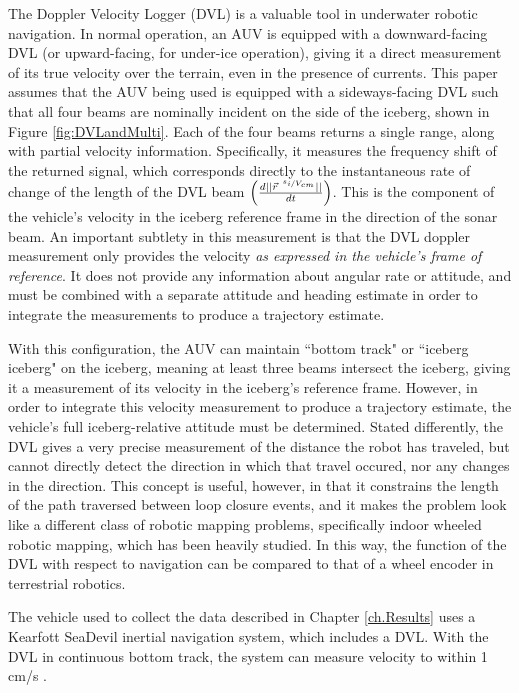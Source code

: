 The Doppler Velocity Logger (DVL) is a valuable tool in underwater robotic navigation. In normal operation, an AUV is equipped with a downward-facing DVL (or upward-facing, for under-ice operation), giving it a direct measurement of its true velocity over the terrain, even in the presence of currents. This paper assumes that the AUV being used is equipped with a sideways-facing DVL such that all four beams are nominally incident on the side of the iceberg, shown in Figure \ref{fig:DVLandMulti}. Each of the four beams returns a single range, along with partial velocity information. Specifically, it measures the frequency shift of the returned signal, which corresponds directly to the instantaneous rate of change of the length of the DVL beam $\left( \frac{d||\vec{r}^{~\nicefrac{s_i}{V_{cm}}}||}{dt}\right)$. This is the component of the vehicle's velocity in the iceberg reference frame in the direction of the sonar beam. An important subtlety in this measurement is that the DVL doppler measurement only provides the velocity \emph{as expressed in the vehicle's frame of reference}. It does not provide any information about angular rate or attitude, and must be combined with a separate attitude and heading estimate in order to integrate the measurements to produce a trajectory estimate. 

With this configuration, the AUV can maintain ``bottom track" or ``iceberg iceberg" on the iceberg, meaning at least three beams intersect the iceberg, giving it a measurement of its velocity in the iceberg's reference frame. However, in order to integrate this velocity measurement to produce a trajectory estimate, the vehicle's full iceberg-relative attitude must be determined. Stated differently, the DVL gives a very precise measurement of the distance the robot has traveled, but cannot directly detect the direction in which that travel occured, nor any changes in the direction. This concept is useful, however, in that it constrains the length of the path traversed between loop closure events, and it makes the problem look like a different class of robotic mapping problems, specifically indoor wheeled robotic mapping, which has been heavily studied. In this way, the function of the DVL with respect to navigation can be compared to that of a wheel encoder in terrestrial robotics.

The vehicle used to collect the data described in Chapter \ref{ch.Results} uses a Kearfott SeaDevil inertial navigation system, which includes a DVL. With the DVL in continuous bottom track, the system can measure velocity to within 1 cm/s \cite{McEwen2005}.

